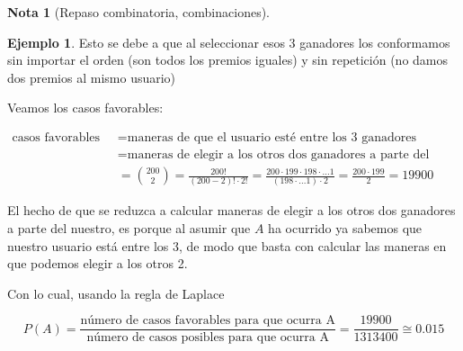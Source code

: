 \documentclass[]{book}
\theoremstyle{plain}
\theoremstyle{definition}
\newtheorem{note}[theorem]{Nota}
\newtheorem{example}[theorem]{Ejemplo}
\begin{document}
\begin{note}[Repaso combinatoria, combinaciones]
\begin{example}
Esto se debe a que al seleccionar esos 3 ganadores los conformamos sin importar el orden (son todos los premios iguales) y sin repetición (no damos dos premios al mismo usuario)
  
Veamos los casos favorables: 

\begin{align*}
  \text{casos favorables para A}&= \text{maneras de que el usuario esté entre los 3 ganadores}\\
  &= \text{maneras de elegir a los otros dos ganadores a parte del nuestro}\\
  &={200 \choose 2} = \frac{200!}{(200-2)! \cdot 2!} = \frac{200 \cdot 199 \cdot 198 \cdot \ldots 1 }{(198 \cdot \ldots 1)\cdot 2} = \frac{200 \cdot 199}{2}= 19900
\end{align*}

El hecho de que se reduzca a calcular maneras de elegir a los otros dos ganadores a parte del nuestro, es porque al asumir que $A$ ha ocurrido ya sabemos que nuestro usuario
está entre los 3, de modo que basta con calcular las maneras en que podemos elegir a los otros 2.

Con lo cual, usando la regla de Laplace

\[P(A) = \frac{\text{número de casos favorables para que ocurra A}}{\text{número de casos posibles para que ocurra A}} = \frac{19900}{1313400}\cong 0.015\]

\end{example}



\end{note}
\end{document}

